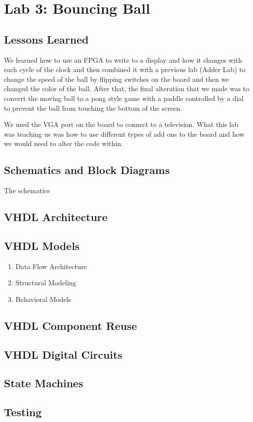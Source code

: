 \chapter{Lab 3: Bouncing Ball \\
\label{Introduction}}

\section{Lessons Learned \label{Section::Lessons Learned}}
    We learned how to use an FPGA to write to a display and how it changes with each cycle of the clock and then combined it with a previous lab (Adder Lab) to change the speed of the ball by flipping switches on the board and then we changed the color of the ball. After that, the final alteration that we made was to convert the moving ball to a pong style game with a paddle controlled by a dial to prevent the ball from touching the bottom of the screen. 

    We used the VGA port on the board to connect to a television. What this lab was teaching us was how to use different types of add ons to the board and how we would need to alter the code within. 
 \section{Schematics and Block Diagrams}
    The schematics
 \section{VHDL Architecture}
 
 \section{VHDL Models}
 
    \begin{enumerate}
        \item Data Flow Architecture
        \item Structural Modeling
        \item Behavioral Models
     \end{enumerate}

 \section{VHDL Component Reuse}
 \section{VHDL Digital Circuits}
 \section{State Machines}
 \section{Testing}
